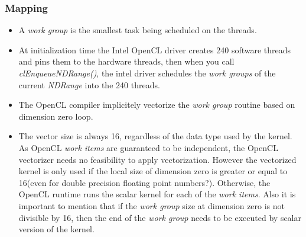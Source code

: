 \subsubsection{Mapping}
\begin{itemize}
    \item A \emph{work group} is the smallest task being scheduled on the threads\cite{opencl_phi}.
    \item At initialization time the Intel OpenCL driver creates 240 software threads and pins them to the hardware threads, then
        when you call \emph{clEnqueueNDRange()}, the intel driver schedules the \emph{work groups} of the current \emph{NDRange}
        into the 240 threads\cite{opencl_phi}.
    \item The OpenCL compiler implicitely vectorize the \emph{work group} routine based on dimension zero loop.
    \item The vector size is always 16, regardless of the data type used by the kernel. As OpenCL \emph{work items} are guaranteed
        to be independent, the OpenCL vectorizer needs no feasibility to apply vectorization. However the vectorized kernel is only
        used if the local size of dimension zero is greater or equal to 16(even for double precision floating point numbers?). 
        Otherwise, the OpenCL runtime runs the scalar kernel for each of the \emph{work items}. Also it is important to mention that
        if the \emph{work group} size at dimension zero is not divisible by 16, then the end of the \emph{work group} needs to be 
        executed by scalar version of the kernel\cite{opencl_phi}.
\end{itemize}


